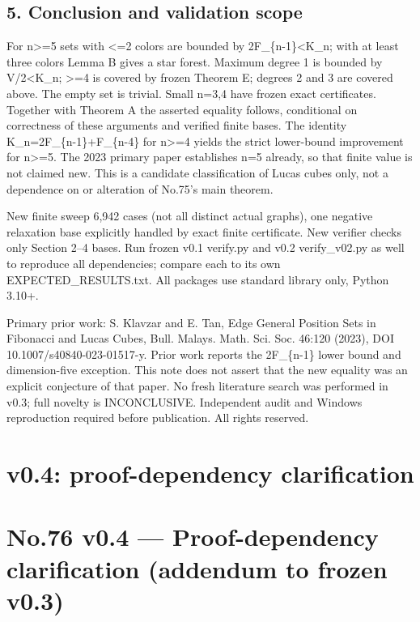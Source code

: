 \documentclass[
  10pt,
]{article}
\begin{document}
\subsection{5. Conclusion and validation
scope}\label{conclusion-and-validation-scope}

For n\textgreater=5 sets with \textless=2 colors are bounded by
2F\_\{n-1\}\textless K\_n; with at least three colors Lemma B gives a
star forest. Maximum degree 1 is bounded by
\textbar V\textbar/2\textless K\_n; \textgreater=4 is covered by frozen
Theorem E; degrees 2 and 3 are covered above. The empty set is trivial.
Small n=3,4 have frozen exact certificates. Together with Theorem A the
asserted equality follows, conditional on correctness of these arguments
and verified finite bases. The identity K\_n=2F\_\{n-1\}+F\_\{n-4\} for
n\textgreater=4 yields the strict lower-bound improvement for
n\textgreater=5. The 2023 primary paper establishes n=5 already, so that
finite value is not claimed new. This is a candidate classification of
Lucas cubes only, not a dependence on or alteration of No.75's main
theorem.

New finite sweep 6,942 cases (not all distinct actual graphs), one
negative relaxation base explicitly handled by exact finite certificate.
New verifier checks only Section 2--4 bases. Run frozen v0.1 verify.py
and v0.2 verify\_v02.py as well to reproduce all dependencies; compare
each to its own EXPECTED\_RESULTS.txt. All packages use standard library
only, Python 3.10+.

Primary prior work: S. Klavzar and E. Tan, Edge General Position Sets in
Fibonacci and Lucas Cubes, Bull. Malays. Math. Sci. Soc. 46:120 (2023),
DOI 10.1007/s40840-023-01517-y. Prior work reports the 2F\_\{n-1\} lower
bound and dimension-five exception. This note does not assert that the
new equality was an explicit conjecture of that paper. No fresh
literature search was performed in v0.3; full novelty is INCONCLUSIVE.
Independent audit and Windows reproduction required before publication.
All rights reserved.

\newpage

\section{v0.4: proof-dependency
clarification}\label{v0.4-proof-dependency-clarification}

\section{No.76 v0.4 --- Proof-dependency clarification (addendum to
frozen
v0.3)}\label{no.76-v0.4-proof-dependency-clarification-addendum-to-frozen-v0.3}
\end{document}
